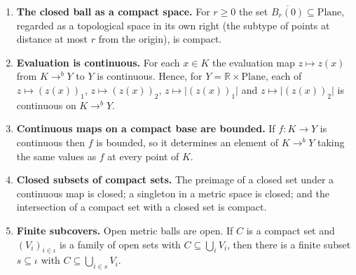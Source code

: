 \begin{proposition}
\begin{enumerate}
\item \textbf{The closed ball as a compact space.}  For $r\ge0$ the set
$\overline{B_r(0)}\subseteq\mathrm{Plane}$, regarded as a topological space in its own right
(the subtype of points at distance at most $r$ from the origin), is compact.
\item \textbf{Evaluation is continuous.}  For each $x\in K$ the evaluation map
$z\mapsto z(x)$ from $K\to^{b}Y$ to $Y$ is continuous.  Hence, for
$Y=\mathbb{R}\times\mathrm{Plane}$, each of $z\mapsto(z(x))_1$, $z\mapsto(z(x))_2$,
$z\mapsto\lvert(z(x))_1\rvert$ and $z\mapsto\lvert(z(x))_2\rvert$ is continuous on
$K\to^{b}Y$.
\item \textbf{Continuous maps on a compact base are bounded.}  If $f\colon K\to Y$ is
continuous then $f$ is bounded, so it determines an element of $K\to^{b}Y$ taking the same
values as $f$ at every point of $K$.
\item \textbf{Closed subsets of compact sets.}  The preimage of a closed set under a continuous
map is closed; a singleton in a metric space is closed; and the intersection of a compact set
with a closed set is compact.
\item \textbf{Finite subcovers.}  Open metric balls are open.  If $C$ is a compact set and
$(V_i)_{i\in\iota}$ is a family of open sets with $C\subseteq\bigcup_{i}V_i$, then there is a
finite subset $s\subseteq\iota$ with $C\subseteq\bigcup_{i\in s}V_i$.
\end{enumerate}
\end{proposition}
